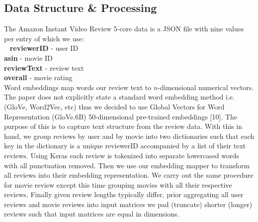 \documentclass[10pt,twocolumn,letterpaper]{article}
\begin{document}
\subsection{Data Structure \& Processing}
The Amazon Instant Video Review 5-core data is a JSON file with nine values per entry of which we use:\\
\ \newline
 \hspace*{10mm}  \textbf{reviewerID} - user ID \\ 
 \hspace*{10mm}  \textbf{asin} - movie ID \\
 \hspace*{10mm}  \textbf{reviewText} - review text \\
 \hspace*{10mm}  \textbf{overall} - movie rating \\

Word embeddings map words our review text to $n$-dimensional numerical vectors. The paper does not explicitly state a standard word embedding method i.e. (GloVe, Word2Vec, etc) thus we decided to use Global Vectors for Word Representation (GloVe.6B) 50-dimensional pre-trained embeddings [10]. The purpose of this is to capture text structure from the review data. With this in hand, we group reviews by user and by movie into two dictionaries such that each key in the dictionary is a unique reviewerID accompanied by a list of their text reviews. Using Keras each review is tokenized into separate lowercased words with all punctuation removed. Then we use our embedding mapper to transform all reviews into their embedding representation. We carry out the same procedure for movie review except this time grouping movies with all their respective reviews. Finally given review lengths typically differ, prior aggregating all user reviews and movie reviews into input matrices we pad (truncate) shorter (longer) reviews such that input matrices are equal in dimensions. 
\end{document}
